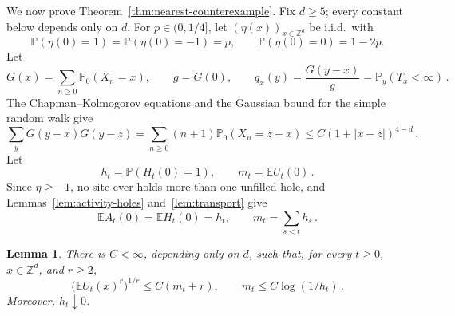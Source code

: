\documentclass[11pt]{amsart}
\theoremstyle{plain}
\newtheorem{lemma}[theorem]{Lemma}
\theoremstyle{definition}
\newcommand{\Z}{\mathbb{Z}}
\newcommand{\E}{\mathbb{E}}
\renewcommand{\P}{\mathbb{P}}
\begin{document}
We now prove Theorem~\ref{thm:nearest-counterexample}. Fix $d\geq5$; every
constant below depends only on $d$. For $p\in(0,1/4]$, let
$(\eta(x))_{x\in\Z^d}$ be i.i.d.\ with
\[
	\P(\eta(0)=1)=\P(\eta(0)=-1)=p,
	\qquad \P(\eta(0)=0)=1-2p.
\]
Let
\[
	G(x)=\sum_{n\geq0}\P_0(X_n=x),\qquad g=G(0),\qquad
	q_x(y)=\frac{G(y-x)}g=\P_y(T_x<\infty)\,.
\]
The Chapman--Kolmogorov equations and the Gaussian bound for the simple random walk
\citep[Section~2.3]{LawlerLimic} give
\begin{equation}\label{eq:nearest-bubble-decay}
	\sum_yG(y-x)G(y-z)
	=\sum_{n\geq0}(n+1)\P_0(X_n=z-x)
	\leq C(1+|x-z|)^{4-d}\,.
\end{equation}
Let
\[
	h_t=\P(H_t(0)=1),\qquad m_t=\E U_t(0)\,.
\]
Since $\eta\geq-1$, no site ever holds more than one unfilled hole, and
Lemmas~\ref{lem:activity-holes} and~\ref{lem:transport} give
\begin{equation}\label{eq:nearest-one-point-identities}
	\E A_t(0)=\E H_t(0)=h_t,\qquad
	m_t=\sum_{s<t}h_s\,.
\end{equation}

\begin{lemma}\label{lem:nearest-one-point}
	There is $C<\infty$, depending only on $d$, such that, for every
	$t\geq0$, $x\in\Z^d$, and $r\geq2$,
	\begin{equation}\label{eq:nearest-odometer-moment}
		\bigl(\E U_t(x)^r\bigr)^{1/r}\leq C(m_t+r),
		\qquad
		m_t\leq C\log(1/h_t)\,.
	\end{equation}
	Moreover, $h_t\downarrow0$.
\end{lemma}
\end{document}
